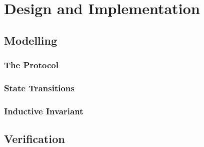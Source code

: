 \chapter{Design and Implementation}

\section{Modelling}

\subsection{The Protocol}

\subsection{State Transitions}

\subsection{Inductive Invariant}

\section{Verification}
